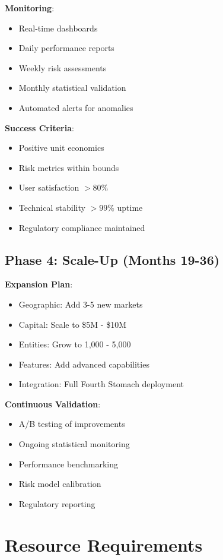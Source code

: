 \documentclass[12pt]{article}
\begin{document}
\textbf{Monitoring}:
\begin{itemize}
    \item Real-time dashboards
    \item Daily performance reports
    \item Weekly risk assessments
    \item Monthly statistical validation
    \item Automated alerts for anomalies
\end{itemize}

\textbf{Success Criteria}:
\begin{itemize}
    \item Positive unit economics
    \item Risk metrics within bounds
    \item User satisfaction $> 80\%$
    \item Technical stability $> 99\%$ uptime
    \item Regulatory compliance maintained
\end{itemize}

\subsection{Phase 4: Scale-Up (Months 19-36)}

\textbf{Expansion Plan}:
\begin{itemize}
    \item Geographic: Add 3-5 new markets
    \item Capital: Scale to \$5M - \$10M
    \item Entities: Grow to 1,000 - 5,000
    \item Features: Add advanced capabilities
    \item Integration: Full Fourth Stomach deployment
\end{itemize}

\textbf{Continuous Validation}:
\begin{itemize}
    \item A/B testing of improvements
    \item Ongoing statistical monitoring
    \item Performance benchmarking
    \item Risk model calibration
    \item Regulatory reporting
\end{itemize}

\section{Resource Requirements}
\end{document}
